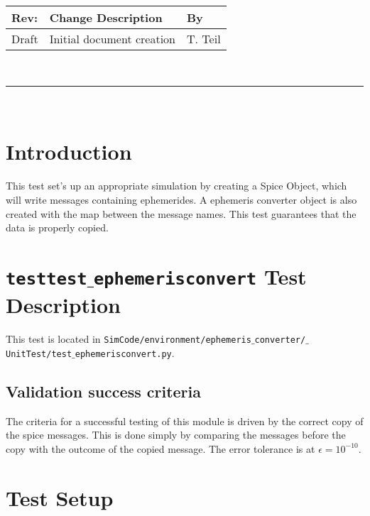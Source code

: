 \documentclass[]{BasiliskReportMemo}
\begin{document}
\makeCover
%
%
\pagestyle{empty}
{\renewcommand{\arraystretch}{1.1}
\noindent
\begin{longtable}{|p{0.5in}|p{4.5in}|p{1.14in}|}
\hline
{\bfseries Rev}: & {\bfseries Change Description} & {\bfseries By} \\
\hline
Draft & Initial document creation & T. Teil \\
\hline

\end{longtable}
}

\newpage
\setcounter{page}{1}
\pagestyle{fancy}

\tableofcontents
~\\ \hrule ~\\



\section{Introduction}
This test set's up an appropriate simulation by creating a Spice Object, which will write messages containing ephemerides. A ephemeris converter object is also created with the map between the message names. This test guarantees that the data is properly copied.


\section{{\tt test\textunderscore test$\_$ephemerisconvert} Test Description}

This test is located in {\tt SimCode/environment/ephemeris$\_$converter/$\_$UnitTest/test$\_$ephemerisconvert.py}. \par

\subsection{Validation success criteria }

The criteria for a successful testing of this module is driven by the correct copy of the spice messages. This is done simply by comparing the messages before the copy with the outcome of the copied message. The error tolerance is at $\epsilon =10^{-10}$. 

\section{Test Setup}
\end{document}
